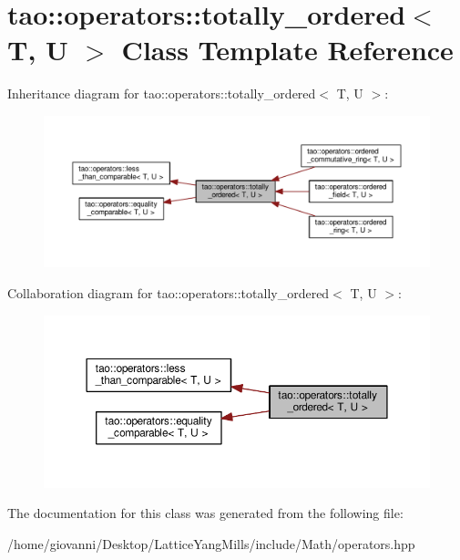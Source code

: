 \hypertarget{classtao_1_1operators_1_1totally__ordered}{}\section{tao\+:\+:operators\+:\+:totally\+\_\+ordered$<$ T, U $>$ Class Template Reference}
\label{classtao_1_1operators_1_1totally__ordered}


Inheritance diagram for tao\+:\+:operators\+:\+:totally\+\_\+ordered$<$ T, U $>$\+:\nopagebreak
\begin{figure}[H]
\begin{center}
\leavevmode
\includegraphics[width=350pt]{classtao_1_1operators_1_1totally__ordered__inherit__graph}
\end{center}
\end{figure}


Collaboration diagram for tao\+:\+:operators\+:\+:totally\+\_\+ordered$<$ T, U $>$\+:\nopagebreak
\begin{figure}[H]
\begin{center}
\leavevmode
\includegraphics[width=350pt]{classtao_1_1operators_1_1totally__ordered__coll__graph}
\end{center}
\end{figure}


The documentation for this class was generated from the following file\+:\begin{DoxyCompactItemize}
\item 
/home/giovanni/\+Desktop/\+Lattice\+Yang\+Mills/include/\+Math/operators.\+hpp\end{DoxyCompactItemize}
